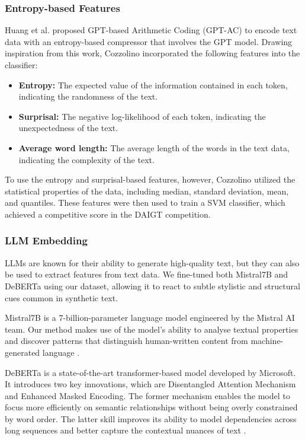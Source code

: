\documentclass[conference]{IEEEtran}
\begin{document}
\subsubsection{Entropy-based Features}

Huang et al. \cite{huang2023gpt} proposed GPT-based Arithmetic Coding (GPT-AC) to encode text data with an entropy-based compressor that involves the GPT model. Drawing inspiration from this work, Cozzolino \cite{6thplace} incorporated the following features into the classifier:
\begin{itemize}
  \item \textbf{Entropy:} The expected value of the information contained in each token, indicating the randomness of the text.
  \item \textbf{Surprisal:} The negative log-likelihood of each token, indicating the unexpectedness of the text.
  \item \textbf{Average word length:} The average length of the words in the text data, indicating the complexity of the text.
\end{itemize}

To use the entropy and surprisal-based features, however, Cozzolino utilized the statistical properties of the data, including median, standard deviation, mean, and quantiles. These features were then used to train a SVM classifier, which achieved a competitive score in the DAIGT competition.

\subsubsection{LLM Embedding}
\label{sec:llm_embedding}

LLMs are known for their ability to generate high-quality text, but they can also be used to extract features from text data. We fine-tuned both Mistral7B and DeBERTa using our dataset, allowing it to react to subtle stylistic and structural cues common in synthetic text.

Mistral7B is a 7-billion-parameter language model engineered by the Mistral AI team. Our method makes use of the model's ability to analyse textual properties and discover patterns that distinguish human-written content from machine-generated language \cite{mistral7b}.

DeBERTa is a state-of-the-art transformer-based model developed by Microsoft. It introduces two key innovations, which are Disentangled Attention Mechanism and Enhanced Masked Encoding. The former mechanism enables the model to focus more efficiently on semantic relationships without being overly constrained by word order. The latter skill improves its ability to model dependencies across long sequences and better capture the contextual nuances of text \cite{deberta}.
\end{document}
